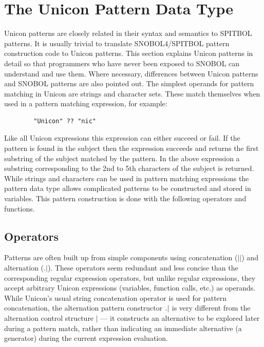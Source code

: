 \documentclass[letterpaper,12pt]{article}
\begin{document}
\section{The Unicon Pattern Data Type }

Unicon patterns are closely related in their syntax and semantics to
SPITBOL \cite{Dewar_McCann} patterns. It is usually trivial to translate
SNOBOL4/SPITBOL pattern construction code to Unicon patterns. This
section explains Unicon patterns in detail so that programmers who
have never been exposed to SNOBOL can understand and use them. Where
necessary, differences between Unicon patterns and SNOBOL patterns are
also pointed out.  The simplest operands for pattern matching in
Unicon are strings and character sets. These match themselves when
used in a pattern matching expression, for example:

\begin{verbatim}
        "Unicon" ?? "nic" 
\end{verbatim}

Like all Unicon expressions this expression can either succeed or
fail. If the pattern is found in the subject then the expression
succeeds and returns the first substring of the subject matched by the
pattern. In the above expression a substring corresponding to the 2nd
to 5th characters of the subject is returned. While strings and
characters can be used in pattern matching expressions the pattern
data type allows complicated patterns to be constructed and stored in
variables. This pattern construction is done with the following
operators and functions.

\subsection{Operators}

Patterns are often built up from simple components using concatenation
($||$) and alternation ($.|$). These operators seem redundant and less
concise than the corresponding regular expression operators, but
unlike regular expressions, they accept arbitrary Unicon expressions
(variables, function calls, etc.) as operands.  While Unicon's
usual string concatenation operator is used for pattern concatenation,
the alternation pattern constructor
${\tt .|}$ is very different from the alternation control structure $|$ ---
it constructs an alternative to be explored later during a
pattern match, rather than indicating an immediate alternative (a
generator) during the current expression evaluation.
\end{document}
